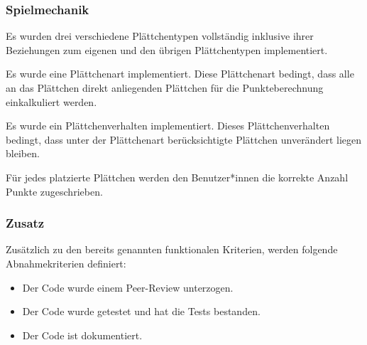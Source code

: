 \documentclass[../main.tex]{subfiles}
\begin{document}
	\subsubsection{Spielmechanik}
	\par Es wurden drei verschiedene Plättchentypen vollständig inklusive ihrer Beziehungen zum eigenen und den übrigen Plättchentypen  implementiert.
	\par Es wurde eine Plättchenart implementiert. Diese Plättchenart bedingt, dass alle an das Plättchen direkt anliegenden Plättchen für die Punkteberechnung einkalkuliert werden.
	\par Es wurde ein Plättchenverhalten implementiert. Dieses Plättchenverhalten bedingt, dass unter der Plättchenart berücksichtigte Plättchen unverändert liegen bleiben.
	\par Für jedes platzierte Plättchen werden den Benutzer*innen die korrekte Anzahl Punkte zugeschrieben.
	
	\subsubsection{Zusatz}
	\par Zusätzlich zu den bereits genannten funktionalen Kriterien, werden folgende Abnahmekriterien definiert:
	\begin{itemize}
		\item Der Code wurde einem Peer-Review unterzogen. 
		\item Der Code wurde getestet und hat die Tests bestanden.
		\item Der Code ist dokumentiert.
	\end{itemize}
\end{document}
